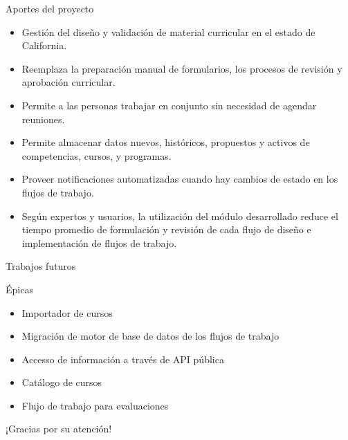 \documentclass[10pt,xcolor=table ]{beamer}
\begin{document}
\begin{frame}{Aportes del proyecto}
	\begin{itemize}
	    \item Gestión del diseño y validación de material curricular en el estado de California.
	    \item Reemplaza la preparación manual de formularios, los procesos de revisión y aprobación curricular.
	    \item Permite a las personas trabajar en conjunto sin necesidad de agendar reuniones.
	    \item Permite almacenar datos nuevos, históricos, propuestos y activos de competencias, cursos, y programas.
	    \item Proveer notificaciones automatizadas cuando hay cambios de estado en los flujos de trabajo.
	    \item Según expertos y usuarios, la utilización del módulo desarrollado reduce el tiempo promedio de formulación y revisión de cada flujo de diseño e implementación de flujos de trabajo.
	\end{itemize}
\end{frame}

\begin{frame}{Trabajos futuros}
	\begin{alertblock}{Épicas}
		\begin{itemize}
			\item Importador de cursos
		    \item Migración de motor de base de datos de los flujos de trabajo
		    \item Accesso de información a través de API pública
		    \item Catálogo de cursos
		    \item Flujo de trabajo para evaluaciones
    	\end{itemize}
	\end{alertblock}
\end{frame}

\begin{frame}[standout]
  ¡Gracias por su atención!
\end{frame}
\end{document}
